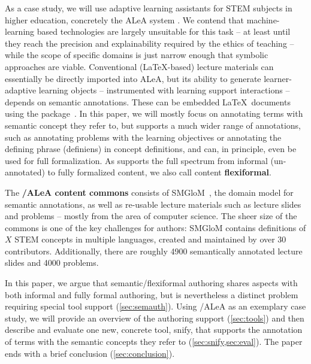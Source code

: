 \documentclass{llncs}
\newcommand\ALeA{\textsf{ALeA}\xspace}
\newcommand\SMGloM{\textsf{SMGloM}\xspace}
\newcommand\snify{\textsf{snify}\xspace}
\begin{document}
As a case study, we will use adaptive learning assistants for STEM subjects in higher education, concretely the \ALeA system \cite{BerBetChu:lssmkm23}.
We contend that machine-learning based technologies are largely unsuitable for this task -- at least until they reach the
precision and explainability required by the ethics of teaching --
while the scope of specific domains is just narrow enough that symbolic approaches are viable.
Conventional (\LaTeX-based) lecture materials can essentially be directly imported into \ALeA,
but its ability to generate learner-adaptive learning objects -- instrumented with learning support interactions --
depends on semantic annotations.
These can be embedded \LaTeX\ documents using the \sTeX package~\cite{MueKo:sdstex22,sTeX:github:on}.
In this paper, we will mostly focus on annotating terms with semantic concept they refer to,
but \sTeX supports a much wider range of annotations, such as annotating problems with the learning objectives
or annotating the defining phrase (definiens) in concept definitions,
and can, in principle, even be used for full formalization.
As \sTeX supports the full spectrum from informal (un-annotated) to fully formalized content,
we also call \sTeX content \textbf{flexiformal}.

The \textbf{\sTeX/\ALeA content commons} consists of \SMGloM~\cite{GinIanJuc:spsttom16},
the domain model for semantic annotations, as well as re-usable lecture materials such as
lecture slides and problems -- mostly from the area of computer science.  The sheer size
of the commons is one of the key challenges for authors: \SMGloM contains definitions of
$X$ STEM concepts in multiple languages, created and maintained by over 30
contributors.  Additionally, there are roughly 4900 semantically annotated lecture slides and 4000 problems.

In this paper, we argue that semantic/flexiformal authoring shares aspects with both informal and fully formal authoring,
but is nevertheless a distinct problem requiring special tool support (\cref{sec:semauth}).
Using \sTeX/\ALeA as an exemplary case study,
we will provide an overview of the authoring support (\cref{sec:tools})
and then describe and evaluate one new, concrete tool, \snify, that supports the annotation
of terms with the semantic concepts they refer to (\cref{sec:snify,sec:eval}).
The paper ends with a brief conclusion (\cref{sec:conclusion}).
\end{document}
